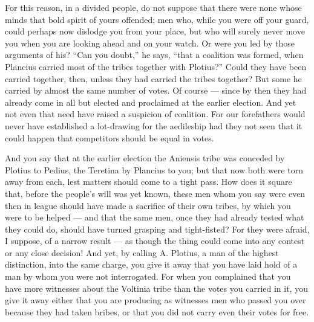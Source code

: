  For this reason, in a divided people, do not suppose that there were none whose minds that bold spirit of yours offended; men who, while you were off your guard, could perhaps now dislodge you from your place, but who will surely never move you when you are looking ahead and on your watch. Or were you led by those arguments of his? ``Can you doubt,'' he says, ``that a coalition was formed, when Plancius carried most of the tribes together with Plotius?'' Could they have been carried together, then, unless they had carried the tribes together? But some he carried by almost the same number of votes. Of course --- since by then they had already come in all but elected and proclaimed at the earlier election. And yet not even that need have raised a suspicion of coalition. For our forefathers would never have established a lot-drawing for the aedileship had they not seen that it could happen that competitors should be equal in votes.

 And you say that at the earlier election the Aniensis tribe was conceded by Plotius to Pedius, the Teretina by Plancius to you; but that now both were torn away from each, lest matters should come to a tight pass. How does it square that, before the people's will was yet known, these men whom you say were even then in league should have made a sacrifice of their own tribes, by which you were to be helped --- and that the same men, once they had already tested what they could do, should have turned grasping and tight-fisted? For they were afraid, I suppose, of a narrow result --- as though the thing could come into any contest or any close decision! And yet, by calling A. Plotius, a man of the highest distinction, into the same charge, you give it away that you have laid hold of a man by whom you were not interrogated. For when you complained that you have more witnesses about the Voltinia tribe than the votes you carried in it, you give it away either that you are producing as witnesses men who passed you over because they had taken bribes, or that you did not carry even their votes for free.

